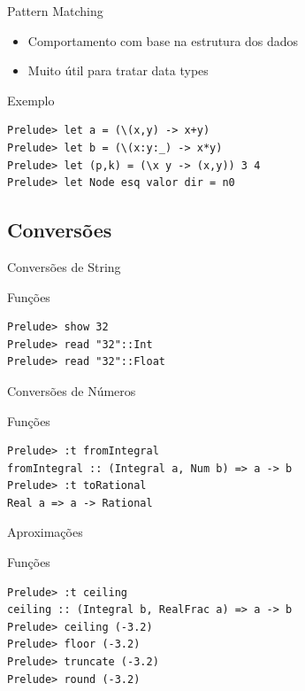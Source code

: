 \documentclass{beamer}
\begin{document}
		\begin{frame}[fragile]{Pattern Matching}
		\begin{itemize}
		 \item Comportamento com base na estrutura dos dados
		 \item Muito útil para tratar data types
		\end{itemize}	
		
		 \begin{block}{Exemplo}
		  \begin{lstlisting}
Prelude> let a = (\(x,y) -> x+y)
Prelude> let b = (\(x:y:_) -> x*y)
Prelude> let (p,k) = (\x y -> (x,y)) 3 4
Prelude> let Node esq valor dir = n0
		  \end{lstlisting}
		 \end{block}
		\end{frame}
		
		\subsection{Conversões}

			\begin{frame}[fragile]{Conversões de String}
			 \begin{block}{Funções}
			  \begin{lstlisting}
Prelude> show 32
Prelude> read "32"::Int
Prelude> read "32"::Float
			  \end{lstlisting}
			 \end{block}
			\end{frame}
			
			\begin{frame}[fragile]{Conversões de Números}
			 \begin{block}{Funções}
				\begin{lstlisting}
Prelude> :t fromIntegral
fromIntegral :: (Integral a, Num b) => a -> b
Prelude> :t toRational
Real a => a -> Rational
				\end{lstlisting}
			 \end{block}				
			\end{frame}
			
			\begin{frame}[fragile]{Aproximações}
			 \begin{block}{Funções}
			  \begin{lstlisting}
Prelude> :t ceiling
ceiling :: (Integral b, RealFrac a) => a -> b
Prelude> ceiling (-3.2)
Prelude> floor (-3.2)
Prelude> truncate (-3.2)
Prelude> round (-3.2)
			  \end{lstlisting}
			 \end{block}
			\end{frame}
			
\end{document}
